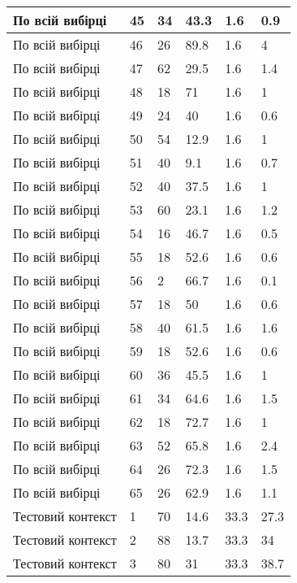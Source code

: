 \begin{longtable}[c]{ | p{2cm} | p{2cm} | p{2cm} | p{2cm} | p{3cm} | p{3cm} | }
	\hline
	По всій вибірці & 45 & 34 & 43.3 & 1.6 & 0.9 \\
	\hline
	По всій вибірці & 46 & 26 & 89.8 & 1.6 & 4 \\
	\hline
	По всій вибірці & 47 & 62 & 29.5 & 1.6 & 1.4 \\
	\hline
	По всій вибірці & 48 & 18 & 71 & 1.6 & 1 \\
	\hline
	По всій вибірці & 49 & 24 & 40 & 1.6 & 0.6 \\
	\hline
	По всій вибірці & 50 & 54 & 12.9 & 1.6 & 1 \\
	\hline
	По всій вибірці & 51 & 40 & 9.1 & 1.6 & 0.7 \\
	\hline
	По всій вибірці & 52 & 40 & 37.5 & 1.6 & 1 \\
	\hline
	По всій вибірці & 53 & 60 & 23.1 & 1.6 & 1.2 \\
	\hline
	По всій вибірці & 54 & 16 & 46.7 & 1.6 & 0.5 \\
	\hline
	По всій вибірці & 55 & 18 & 52.6 & 1.6 & 0.6 \\
	\hline
	По всій вибірці & 56 & 2 & 66.7 & 1.6 & 0.1 \\
	\hline
	По всій вибірці & 57 & 18 & 50 & 1.6 & 0.6 \\
	\hline
	По всій вибірці & 58 & 40 & 61.5 & 1.6 & 1.6 \\
	\hline
	По всій вибірці & 59 & 18 & 52.6 & 1.6 & 0.6 \\
	\hline
	По всій вибірці & 60 & 36 & 45.5 & 1.6 & 1 \\
	\hline
	По всій вибірці & 61 & 34 & 64.6 & 1.6 & 1.5 \\
	\hline
	По всій вибірці & 62 & 18 & 72.7 & 1.6 & 1 \\
	\hline
	По всій вибірці & 63 & 52 & 65.8 & 1.6 & 2.4 \\
	\hline
	По всій вибірці & 64 & 26 & 72.3 & 1.6 & 1.5 \\
	\hline
	По всій вибірці & 65 & 26 & 62.9 & 1.6 & 1.1 \\
	\hline
	\hline
	\hline
	Тестовий контекст & 1 & 70 & 14.6 & 33.3 & 27.3 \\
	\hline
	Тестовий контекст & 2 & 88 & 13.7 & 33.3 & 34 \\
	\hline
	Тестовий контекст & 3 & 80 & 31 & 33.3 & 38.7 \\
\end{longtable}%

